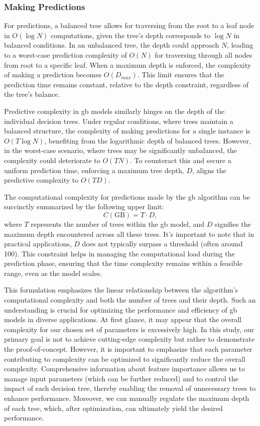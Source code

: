 \subsubsection{Making Predictions}
For predictions, a balanced tree allows for traversing from the root to a leaf node in $O(\log N)$ computations, given the tree's depth corresponds to $\log N$ in balanced conditions.
In an unbalanced tree, the depth could approach $N$, leading to a worst-case prediction complexity of $O(N)$ for traversing through all nodes from root to a specific leaf.
When a maximum depth is enforced, the complexity of making a prediction becomes $O(D_{max})$. This limit ensures that the prediction time remains constant, relative to the depth constraint, regardless of the tree's balance.

Predictive complexity in \acrlong{gb} models similarly hinges on the depth of the individual decision trees. Under regular conditions, where trees maintain a balanced structure, the complexity of making predictions for a single instance is $O(T\log N)$, benefiting from the logarithmic depth of balanced trees. However, in the worst-case scenario, where trees may be significantly unbalanced, the complexity could deteriorate to $O(TN)$. To counteract this and secure a uniform prediction time, enforcing a maximum tree depth, $D$, aligns the predictive complexity to $O(TD)$.

The computational complexity for predictions made by the \acrlong{gb} algorithm can be succinctly summarized by the following upper limit:
\begin{equation}
    C(\mathrm{GB}) = T \cdot D,
\end{equation}
where \(T\) represents the number of trees within the \acrlong{gb} model, and \(D\) signifies the maximum depth encountered across all these trees. It's important to note that in practical applications, \(D\) does not typically surpass a threshold (often around 100). This constraint helps in managing the computational load during the prediction phase, ensuring that the time complexity remains within a feasible range, even as the model scales.

This formulation emphasizes the linear relationship between the algorithm's computational complexity and both the number of trees and their depth. Such an understanding is crucial for optimizing the performance and efficiency of \acrlong{gb} models in diverse applications.
At first glance, it may appear that the overall complexity for our chosen set of parameters is excessively high. In this study, our primary goal is not to achieve cutting-edge complexity but rather to demonstrate the proof-of-concept. However, it is important to emphasize that each parameter contributing to complexity can be optimized to significantly reduce the overall complexity. Comprehensive information about feature importance allows us to manage input parameters (which can be further reduced) and to control the impact of each decision tree, thereby enabling the removal of unnecessary trees to enhance performance. Moreover, we can manually regulate the maximum depth of each tree, which, after optimization, can ultimately yield the desired performance.

